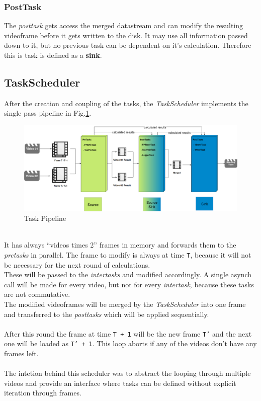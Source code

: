 \documentclass[titlepage]{article}
\begin{document}
\subsubsection{PostTask}
The \textit{posttask} gets access the merged datastream and can modify the resulting videoframe before it gets written to the disk. It may use all information passed down to it, but no previous task can be dependent on it's calculation. Therefore this is task is defined as a \textbf{sink}.

\newpage

\subsection{TaskScheduler}
\label{header:task-scheduler}

After the creation and coupling of the tasks, the \textit{TaskScheduler} implements the single pass pipeline in Fig.\ref{fig:source-sink}.

\begin{figure}[H]
\hspace{-30mm}
\includegraphics[width=500pt,left]{../../images/trdrop-source-sink.eps}
\caption{Task Pipeline}
\label{fig:source-sink}
\end{figure}
\hfill \\
It has always ``videos times 2'' frames in memory and forwards them to the \textit{pretasks} in parallel. The frame to modify is always at time \texttt{T}, because it will not be necessary for the next round of calculations.\\[4mm]
These will be passed to the \textit{intertasks} and modified accordingly. A single asynch call will be made for every video, but not for every \textit{intertask}, because these tasks are not commutative. \\[4mm]
The modified videoframes will be merged by the \textit{TaskScheduler} into one frame and transferred to the \textit{posttasks} which will be applied sequentially. \\
\hfill \\
After this round the frame at time \texttt{T + 1} will be the new frame \texttt{T'} and the next one will be loaded as \texttt{T' + 1}.
This loop aborts if any of the videos don't have any frames left.\\
\hfill \\
The intetion behind this scheduler was to abstract the looping through multiple videos and provide an interface where tasks can be defined without explicit iteration through frames.
\end{document}
